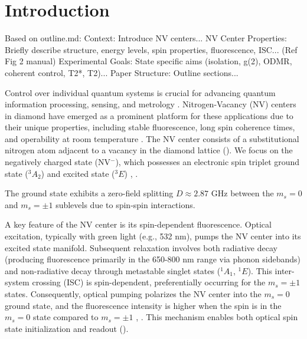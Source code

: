 \documentclass[aps,prb,twocolumn,superscriptaddress,floatfix,longbibliography,citeautoscript]{revtex4-2}
\begin{document}
\maketitle

\section{\label{sec:intro}Introduction}
Based on outline.md:
Context: Introduce NV centers...
NV Center Properties: Briefly describe structure, energy levels, spin properties, fluorescence, ISC... (Ref Fig 2 manual)
Experimental Goals: State specific aims (isolation, g(2), ODMR, coherent control, T2*, T2)...
Paper Structure: Outline sections...

Control over individual quantum systems is crucial for advancing quantum information processing, sensing, and metrology . %
Nitrogen-Vacancy (NV) centers in diamond have emerged as a prominent platform for these applications due to their unique properties, including stable fluorescence, long spin coherence times, and operability at room temperature . %
The NV center consists of a substitutional nitrogen atom adjacent to a 
vacancy in the diamond lattice (). 
We focus on the negatively charged state (NV$^-$), 
which possesses an electronic spin triplet ground state ($^3 A_2$) 
and excited state ($^3 E$) , 
. %

The ground state exhibits a zero-field splitting $D \approx 2.87$ GHz between the $m_s=0$ and $m_s=\pm 1$ sublevels due to spin-spin interactions. 

A key feature of the NV center is its spin-dependent 
fluorescence. Optical excitation, typically with green light (e.g., 532 nm), 
pumps the NV center into its excited state manifold. 
Subsequent relaxation involves both radiative decay (producing fluorescence primarily in the 650-800 nm range via phonon sidebands) 
and non-radiative decay through metastable singlet states ($^1 A_1$, $^1 E$). 
This inter-system crossing (ISC) is spin-dependent, preferentially occurring for the $m_s=\pm 1$ states. 
Consequently, optical pumping polarizes the NV center into the $m_s=0$ ground state, 
and the fluorescence intensity is higher when the spin is in the $m_s=0$ state compared to $m_s=\pm 1$ 
, . This mechanism enables both optical spin state initialization and readout 
(). 
\end{document}
